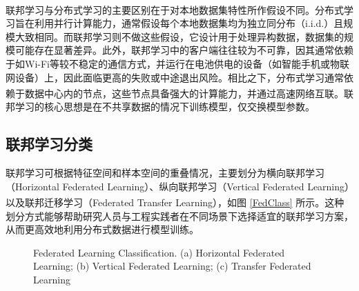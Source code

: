联邦学习与分布式学习的主要区别在于对本地数据集特性所作假设不同\textsuperscript{\cite{konevcny2015federated}}。分布式学习旨在利用并行计算能力，通常假设每个本地数据集均为独立同分布（i.i.d.）且规模大致相同。而联邦学习则不做这些假设，它设计用于处理异构数据，数据集的规模可能存在显著差异。此外，联邦学习中的客户端往往较为不可靠，因其通常依赖于如Wi-Fi等较不稳定的通信方式，并运行在电池供电的设备（如智能手机或物联网设备）上，因此面临更高的失败或中途退出风险。相比之下，分布式学习通常依赖于数据中心内的节点，这些节点具备强大的计算能力，并通过高速网络互联\textsuperscript{\cite{kairouz2021advances}}。联邦学习的核心思想是在不共享数据的情况下训练模型，仅交换模型参数。

\subsection{联邦学习分类}
联邦学习可根据特征空间和样本空间的重叠情况，主要划分为横向联邦学习（Horizontal Federated Learning）、纵向联邦学习（Vertical Federated Learning）以及联邦迁移学习（Federated Transfer Learning）\textsuperscript{\cite{yang2019federated,li2020federated}}，如图 \ref{FedClass} 所示。这种划分方式能够帮助研究人员与工程实践者在不同场景下选择适宜的联邦学习方案，从而更高效地利用分布式数据进行模型训练。

\begin{figure}[!h]
	\centering
	\hspace{0.01\textwidth}
	\hspace{0.01\textwidth}
	
	{\centering \wuhao Federated Learning Classification. (a) Horizontal Federated Learning; (b) Vertical Federated Learning; (c) Transfer Federated Learning}	
	\label{fig:FedClass}
\end{figure}


